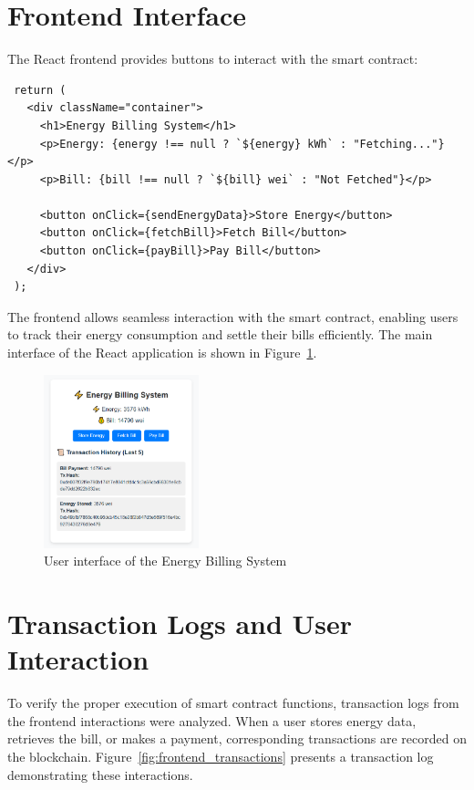 \documentclass[a4paper,12pt]{report}
\begin{document}
 \section{Frontend Interface}
 The React frontend provides buttons to interact with the smart contract:
 
 \begin{lstlisting}
 return (
   <div className="container">
     <h1>Energy Billing System</h1>
     <p>Energy: {energy !== null ? `${energy} kWh` : "Fetching..."}</p>
     <p>Bill: {bill !== null ? `${bill} wei` : "Not Fetched"}</p>
     
     <button onClick={sendEnergyData}>Store Energy</button>
     <button onClick={fetchBill}>Fetch Bill</button>
     <button onClick={payBill}>Pay Bill</button>
   </div>
 );
 \end{lstlisting}
 The frontend allows seamless interaction with the smart contract, enabling users to track their energy consumption and settle their bills efficiently. The main interface of the React application is shown in Figure~\ref{fig:frontend_ui}.

\begin{figure}[H]
\centering
\includegraphics[width=0.4\textwidth]{web3 App.PNG}
\caption{User interface of the Energy Billing System}
\label{fig:frontend_ui}
\end{figure}

\section{Transaction Logs and User Interaction}
To verify the proper execution of smart contract functions, transaction logs from the frontend interactions were analyzed. When a user stores energy data, retrieves the bill, or makes a payment, corresponding transactions are recorded on the blockchain. Figure~\ref{fig:frontend_transactions} presents a transaction log demonstrating these interactions.
\end{document}
